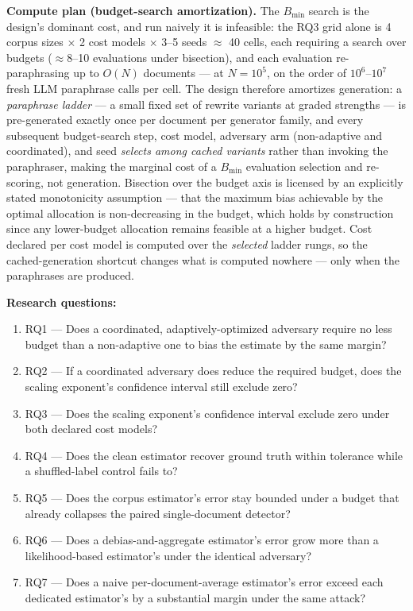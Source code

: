\documentclass[11pt]{article}
\begin{document}
\textbf{Compute plan (budget-search amortization).} The $B_{\min}$ search is the design's dominant cost, and run naively it is infeasible: the RQ3 grid alone is 4 corpus sizes $\times$ 2 cost models $\times$ 3--5 seeds $\approx$ 40 cells, each requiring a search over budgets ($\approx$8--10 evaluations under bisection), and each evaluation re-paraphrasing up to $O(N)$ documents --- at $N = 10^5$, on the order of $10^6$--$10^7$ fresh LLM paraphrase calls per cell. The design therefore amortizes generation: a \emph{paraphrase ladder} --- a small fixed set of rewrite variants at graded strengths --- is pre-generated exactly once per document per generator family, and every subsequent budget-search step, cost model, adversary arm (non-adaptive and coordinated), and seed \emph{selects among cached variants} rather than invoking the paraphraser, making the marginal cost of a $B_{\min}$ evaluation selection and re-scoring, not generation. Bisection over the budget axis is licensed by an explicitly stated monotonicity assumption --- that the maximum bias achievable by the optimal allocation is non-decreasing in the budget, which holds by construction since any lower-budget allocation remains feasible at a higher budget. Cost declared per cost model is computed over the \emph{selected} ladder rungs, so the cached-generation shortcut changes what is computed nowhere --- only when the paraphrases are produced.

\textbf{Research questions:}
\begin{enumerate}[leftmargin=1.6em]
\item RQ1 --- Does a coordinated, adaptively-optimized adversary require no less budget than a non-adaptive one to bias the estimate by the same margin?
\item RQ2 --- If a coordinated adversary does reduce the required budget, does the scaling exponent's confidence interval still exclude zero?
\item RQ3 --- Does the scaling exponent's confidence interval exclude zero under both declared cost models?
\item RQ4 --- Does the clean estimator recover ground truth within tolerance while a shuffled-label control fails to?
\item RQ5 --- Does the corpus estimator's error stay bounded under a budget that already collapses the paired single-document detector?
\item RQ6 --- Does a debias-and-aggregate estimator's error grow more than a likelihood-based estimator's under the identical adversary?
\item RQ7 --- Does a naive per-document-average estimator's error exceed each dedicated estimator's by a substantial margin under the same attack?
\end{enumerate}
\end{document}
